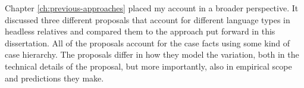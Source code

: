 Chapter \ref{ch:previous-approaches} placed my account in a broader perspective. It discussed three different proposals that account for different language types in headless relatives and compared them to the approach put forward in this dissertation. All of the proposals account for the case facts using some kind of case hierarchy. The proposals differ in how they model the variation, both in the technical details of the proposal, but more importantly, also in empirical scope and predictions they make.

